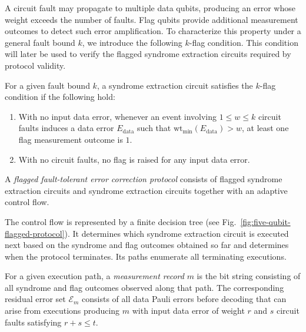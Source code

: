 \documentclass[acmsmall,screen,review,anonymous,nonacm]{acmart}
\newcommand{\showcomment}[1]{#1}
\newcommand{\cy}[1]{\showcomment{\textcolor{blue}{\textbf{CY:} #1}}}
\renewcommand{\cy}[1]{}
\begin{document}
A circuit fault may propagate to multiple data qubits, producing
an error whose weight exceeds the number of faults. Flag qubits
provide additional measurement outcomes to detect such error
amplification. To characterize this property under a general fault
bound $k$, we introduce the following $k$-flag condition.
This condition will later be used to verify the flagged syndrome
extraction circuits required by protocol validity.
\begin{definition} \label{def:flag}
For a given fault bound $k$, a syndrome extraction circuit satisfies
the $k$-flag condition if the following hold:
\begin{enumerate}
    \item With no input data error, whenever an event involving $1\le w\le k$
    circuit faults induces a data error $E_{\mathrm{data}}$ such that
    $\mathrm{wt}_{\min}(E_{\mathrm{data}})>w$, at least one flag
    measurement outcome is $1$.
    \item With no circuit faults, no flag is raised for any input data error.
\end{enumerate}
\end{definition}






A \textit{flagged fault-tolerant error correction protocol} consists of flagged syndrome extraction circuits and syndrome extraction circuits together with an adaptive control flow. 

The control flow is represented by a finite decision tree (see Fig.~\ref{fig:five-qubit-flagged-protocol}). It determines which syndrome extraction circuit is executed next based on the syndrome and flag outcomes obtained so far and determines when the protocol terminates.
Its paths enumerate all terminating executions.


\begin{definition}
\label{def:measurement-record-and-residual-error}
For a given execution path, a \emph{measurement record} $m$ is the bit string consisting of all syndrome and flag outcomes observed along that path.
The corresponding residual error set $\mathcal E_m$ consists of all data
Pauli errors before decoding that can arise from executions producing $m$
with input data error of weight $r$ and $s$ circuit faults satisfying
$r+s\le t$.
\end{definition}
\end{document}
